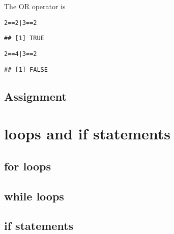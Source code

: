 \documentclass[12pt,a4paper]{scrartcl}\usepackage[]{graphicx}\usepackage[]{color}
\makeatletter
\newcommand{\hlnum}[1]{\textcolor[rgb]{0.686,0.059,0.569}{#1}}%
\newcommand{\hlopt}[1]{\textcolor[rgb]{0,0,0}{#1}}%
\newenvironment{kframe}{%
 \def\at@end@of@kframe{}%
 \ifinner\ifhmode%
  \def\at@end@of@kframe{\end{minipage}}%
  \begin{minipage}{\columnwidth}%
 \fi\fi%
 \def\FrameCommand##1{\hskip\@totalleftmargin \hskip-\fboxsep
 \colorbox{shadecolor}{##1}\hskip-\fboxsep
     \hskip-\linewidth \hskip-\@totalleftmargin \hskip\columnwidth}%
 \MakeFramed {\advance\hsize-\width
   \@totalleftmargin\z@ \linewidth\hsize
   \@setminipage}}%
 {\par\unskip\endMakeFramed%
 \at@end@of@kframe}
\newenvironment{knitrout}{}{} %
\makeatother
\begin{document}
The OR operator is \texttt{\textbar}
\begin{knitrout}
\color{fgcolor}\begin{kframe}
\begin{alltt}
\hlnum{2} \hlopt{==} \hlnum{2} \hlopt{|} \hlnum{3}\hlopt{==}\hlnum{2}
\end{alltt}
\begin{verbatim}
## [1] TRUE
\end{verbatim}
\begin{alltt}
\hlnum{2} \hlopt{==} \hlnum{4} \hlopt{|} \hlnum{3}\hlopt{==}\hlnum{2}
\end{alltt}
\begin{verbatim}
## [1] FALSE
\end{verbatim}
\end{kframe}
\end{knitrout}



\subsection{Assignment}




\section{loops and if statements}

\subsection{for loops}

\subsection{while loops}

\subsection{if statements}
\end{document}
